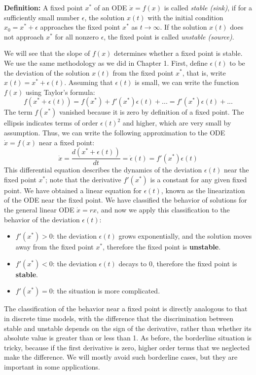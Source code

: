 \documentclass[11pt]{book}
\begin{document}
\textbf{Definition:} A fixed point  $x^*$ of an ODE $\dot x = f(x)$ is called \emph{stable (sink)}, if for a sufficiently small number $\epsilon$, the solution $x(t)$ with the initial condition $x_0 = x^* + \epsilon$ approaches the fixed point $x^*$ as $t \rightarrow \infty$. If the solution $x(t)$ does not approach $x^*$ for all nonzero $\epsilon$, the fixed point is called \emph{unstable (source)}.

We will see that the slope of $f(x)$ determines whether a fixed point is stable. We use the same methodology as we did in Chapter 1. First, define $\epsilon(t)$ to be the deviation of the solution $x(t)$ from the fixed point $x^*$, that is, write $x(t) = x^* + \epsilon(t)$. Assuming that $\epsilon(t)$ is small, we can write the function $f(x)$ using Taylor's formula:
$$ f(x^*+\epsilon(t))= f(x^*)+f'(x^*) \epsilon(t) + ... = f'(x^*) \epsilon(t) + ... $$
The term $f(x^*)$ vanished because it is zero by definition of a fixed point. The ellipsis indicates terms of order $\epsilon(t)^2$ and higher, which are very small by assumption. Thus, we can write the following approximation to the ODE $\dot x = f(x)$ near a fixed point:
$$ \dot x =  \frac{ d(x^* + \epsilon(t))}{dt} = \dot \epsilon(t) =  f'(x^*) \epsilon(t)$$
This differential equation describes the dynamics of the deviation $\epsilon(t)$ near the fixed point $x^*$; note that the derivative $f'(x^*)$ is a constant for any given fixed point. We have obtained a linear equation for $\epsilon(t)$, known as the linearization of the ODE near the fixed point. We have classified the behavior of solutions for the general linear ODE $\dot x = rx$, and now we apply this classification to the behavior of the deviation $\epsilon(t)$:
\begin{itemize}
\item $f'(x^*) > 0$: the deviation  $\epsilon(t)$ grows exponentially, and the solution moves away from the fixed point $x^*$, therefore the fixed point is \textbf{unstable}.
\item $f'(x^*) < 0$: the deviation $\epsilon(t)$ decays to 0, therefore the fixed point is \textbf{stable}.
\item $f'(x^*) = 0$: the situation is more complicated.
\end{itemize}
The classification of the  behavior near a fixed point is directly analogous to that in discrete time models, with the difference that the discrimination between stable and unstable depends on the sign of the derivative, rather than whether its absolute value is greater than or less than 1. As before, the borderline situation is tricky, because if the first derivative is zero, higher order terms that we neglected make the difference. We will mostly avoid such borderline cases, but they are important in some applications.
\end{document}
